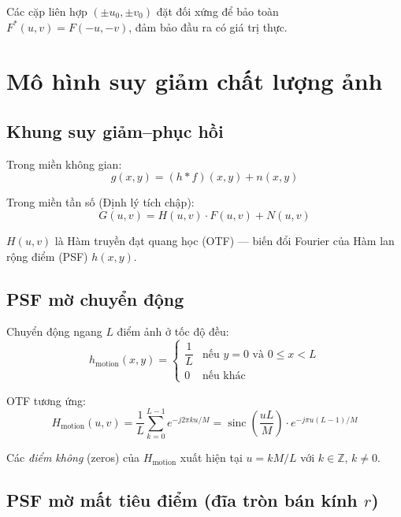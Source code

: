 \documentclass[12pt, a4paper]{article}
\begin{document}
Các cặp liên hợp $(\pm u_0, \pm v_0)$ đặt đối xứng để bảo toàn
$F^*(u,v) = F(-u,-v)$, đảm bảo đầu ra có giá trị thực.

\section{Mô hình suy giảm chất lượng ảnh}

\subsection{Khung suy giảm--phục hồi}

Trong miền không gian:
\begin{equation}
  g(x,y) = (h * f)(x,y) + n(x,y)
  \label{eq:degradation_spatial}
\end{equation}

Trong miền tần số (Định lý tích chập):
\begin{equation}
  G(u,v) = H(u,v) \cdot F(u,v) + N(u,v)
  \label{eq:degradation_freq}
\end{equation}

$H(u,v)$ là Hàm truyền đạt quang học (OTF) --- biến đổi Fourier của
Hàm lan rộng điểm (PSF) $h(x,y)$.

\subsection{PSF mờ chuyển động}

Chuyển động ngang $L$ điểm ảnh ở tốc độ đều:
\begin{equation}
  h_{\mathrm{motion}}(x,y) = 
  \begin{cases}
    \dfrac{1}{L} & \text{nếu } y = 0 \text{ và } 0 \le x < L \\[6pt]
    0            & \text{nếu khác}
  \end{cases}
  \label{eq:psf_motion}
\end{equation}

OTF tương ứng:
\begin{equation}
  H_{\mathrm{motion}}(u,v) = \frac{1}{L}\sum_{k=0}^{L-1} e^{-j2\pi ku/M} = \operatorname{sinc}\!\left(\frac{uL}{M}\right) \cdot e^{-j\pi u(L-1)/M}
  \label{eq:otf_motion}
\end{equation}

Các \emph{điểm không} (zeros) của $H_{\mathrm{motion}}$ xuất hiện tại
$u = kM/L$ với $k \in \mathbb{Z}$, $k \ne 0$.

\subsection{PSF mờ mất tiêu điểm (đĩa tròn bán kính $r$)}
\end{document}
